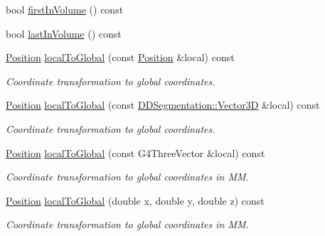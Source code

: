 \begin{DoxyCompactItemize}
\item 
bool \hyperlink{class_d_d4hep_1_1_simulation_1_1_geant4_step_handler_a96df262594297b7030eaac7ed154c622}{first\+In\+Volume} () const
\item 
bool \hyperlink{class_d_d4hep_1_1_simulation_1_1_geant4_step_handler_a473152bc5d131b17fff220204f1a866c}{last\+In\+Volume} () const
\item 
\hyperlink{namespace_d_d4hep_1_1_geometry_a55083902099d03506c6db01b80404900}{Position} \hyperlink{class_d_d4hep_1_1_simulation_1_1_geant4_step_handler_a5b70d64c9a938c857e5b63fa996aaf1e}{local\+To\+Global} (const \hyperlink{namespace_d_d4hep_1_1_geometry_a55083902099d03506c6db01b80404900}{Position} \&local) const
\begin{DoxyCompactList}\small\item\em Coordinate transformation to global coordinates. \end{DoxyCompactList}\item 
\hyperlink{namespace_d_d4hep_1_1_geometry_a55083902099d03506c6db01b80404900}{Position} \hyperlink{class_d_d4hep_1_1_simulation_1_1_geant4_step_handler_ab778e17a1f7038772c91d128c680f65b}{local\+To\+Global} (const \hyperlink{struct_d_d4hep_1_1_d_d_segmentation_1_1_vector3_d}{D\+D\+Segmentation\+::\+Vector3D} \&local) const
\begin{DoxyCompactList}\small\item\em Coordinate transformation to global coordinates. \end{DoxyCompactList}\item 
\hyperlink{namespace_d_d4hep_1_1_geometry_a55083902099d03506c6db01b80404900}{Position} \hyperlink{class_d_d4hep_1_1_simulation_1_1_geant4_step_handler_a9ea78bcf920fa47e9bbb84a71f91acfa}{local\+To\+Global} (const G4\+Three\+Vector \&local) const
\begin{DoxyCompactList}\small\item\em Coordinate transformation to global coordinates in MM. \end{DoxyCompactList}\item 
\hyperlink{namespace_d_d4hep_1_1_geometry_a55083902099d03506c6db01b80404900}{Position} \hyperlink{class_d_d4hep_1_1_simulation_1_1_geant4_step_handler_a8010afaef177a2734e709daa23e724c9}{local\+To\+Global} (double x, double y, double z) const
\begin{DoxyCompactList}\small\item\em Coordinate transformation to global coordinates in MM. \end{DoxyCompactList}\item 

\end{DoxyCompactItemize}
